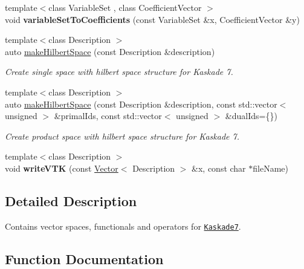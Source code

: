 \begin{DoxyCompactItemize}
\item 
{\footnotesize template$<$class Variable\+Set , class Coefficient\+Vector $>$ }\\void {\bfseries variable\+Set\+To\+Coefficients} (const Variable\+Set \&x, Coefficient\+Vector \&y)\hypertarget{namespaceSpacy_1_1Kaskade_aa69d49f1744cff3e4bd945d292e32018}{}\label{namespaceSpacy_1_1Kaskade_aa69d49f1744cff3e4bd945d292e32018}

\item 
{\footnotesize template$<$class Description $>$ }\\auto \hyperlink{group__VectorSpaceGroup_ga04d45446864bbf87770d02eade7b64cf}{make\+Hilbert\+Space} (const Description \&description)
\begin{DoxyCompactList}\small\item\em Create single space with hilbert space structure for Kaskade 7. \end{DoxyCompactList}\item 
{\footnotesize template$<$class Description $>$ }\\auto \hyperlink{group__VectorSpaceGroup_ga221db25c41371a2a823a6b569d735ef6}{make\+Hilbert\+Space} (const Description \&description, const std\+::vector$<$ unsigned $>$ \&primal\+Ids, const std\+::vector$<$ unsigned $>$ \&dual\+Ids=\{\})
\begin{DoxyCompactList}\small\item\em Create product space with hilbert space structure for Kaskade 7. \end{DoxyCompactList}\item 
{\footnotesize template$<$class Description $>$ }\\void {\bfseries write\+V\+TK} (const \hyperlink{classSpacy_1_1Kaskade_1_1Vector}{Vector}$<$ Description $>$ \&x, const char $\ast$file\+Name)\hypertarget{namespaceSpacy_1_1Kaskade_ab5f26938161de79afaba223ca4a5dfa8}{}\label{namespaceSpacy_1_1Kaskade_ab5f26938161de79afaba223ca4a5dfa8}

\end{DoxyCompactItemize}


\subsection{Detailed Description}
Contains vector spaces, functionals and operators for \href{http://www.zib.de/projects/kaskade7-finite-element-toolbox}{\tt Kaskade7}. 

\subsection{Function Documentation}
